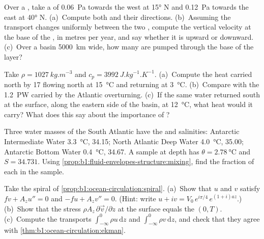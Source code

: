 \begin{exercise}[$\star\star$]\label{exo:b1:ocean-circulation:7}
Over a , take a  of \qty{0.06}{Pa} towards the west at
\ang{15} N and \qty{0.12}{Pa} towards the east at \ang{40} N. (a)~Compute both  and their directions. (b)~Assuming the transport changes uniformly between
the two , compute the vertical velocity at the base of the , in
metres per year, and say whether it is upward or downward. (c)~Over a basin
\qty{5000}{km} wide, how many  are pumped through the base of the layer?
\end{exercise}

\begin{exercise}[$\star\star$]\label{exo:b1:ocean-circulation:8}
Take $\rho = \qty{1027}{kg.m^{-3}}$ and $c_p = \qty{3992}{J.kg^{-1}.K^{-1}}$.
(a)~Compute the heat carried north by \qty{17}{\sverdrup} flowing north at
\qty{15}{\celsius} and returning at \qty{3}{\celsius}. (b)~Compare with the
\qty{1.2}{PW} carried by the Atlantic overturning. (c)~If the same water returned
south at the surface, along the eastern side of the basin, at \qty{12}{\celsius},
what heat would it carry? What does this say about the importance of ?
\end{exercise}

\begin{exercise}[$\star\star$]\label{exo:b1:ocean-circulation:9}
Three water masses of the South Atlantic have the  and
salinities: Antarctic Intermediate Water \qty{3.3}{\celsius}, 34.15; North Atlantic
Deep Water \qty{4.0}{\celsius}, 35.00; Antarctic Bottom Water \qty{0.4}{\celsius},
34.67. A sample at depth has $\theta = \qty{2.78}{\celsius}$ and $S = 34.731$.
Using \cref{prop:b1:fluid-envelopes-structure:mixing}, find the fraction of each
 in the sample.
\end{exercise}

\begin{exercise}[$\star\star\star$]\label{exo:b1:ocean-circulation:10}
Take the spiral of \cref{prop:b1:ocean-circulation:spiral}. (a)~Show that $u$ and $v$
satisfy $f v + A_z u'' = 0$ and $-f u + A_z v'' = 0$. (Hint: write $u + iv =
V_0\,e^{i\pi/4}\,e^{(1+i)az}$.) (b)~Show that the stress $\rho A_z\,\partial\vec
v/\partial z$ at the surface equals the  $(0, T)$. (c)~Compute the
transports $\int_{-\infty}^0 \rho u\,\mathrm dz$ and $\int_{-\infty}^0 \rho
v\,\mathrm dz$, and check that they agree with
\cref{thm:b1:ocean-circulation:ekman}.
\end{exercise}

